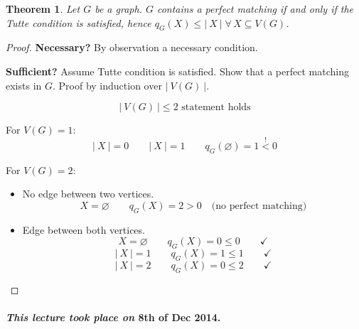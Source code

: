 \documentclass{article}
\newtheorem{theorem}{Theorem}
\newcommand{\card}[1]{\left|\:\!#1\:\!\right|}
\newcommand{\dateref}[1]{\paragraph{\textit{This lecture took place on} #1.}}
\newcommand{\fall}{\;\forall\,}
\begin{document}
\begin{theorem}\label{satz-6.6}
  Let $G$ be a graph. $G$ contains a perfect matching if and only if the Tutte condition is satisfied,
  hence $q_G(X) \leq \card{X} \fall X \subseteq V(G)$.
\end{theorem}

\begin{proof}
  \textbf{Necessary?} By observation a necessary condition.

  \textbf{Sufficient?} Assume Tutte condition is satisfied. Show that a perfect matching exists in $G$.
  Proof by induction over $\card{V(G)}$.

  \[ \card{V(G)} \leq 2 \text{ statement holds} \]

  For $V(G) = 1$:
  \[  \card{X} = 0 \qquad \card{X} = 1 \qquad q_G(\diameter) = 1 \stackrel{!}{<} 0 \]

  For $V(G) = 2$:
  \begin{itemize}
    \item No edge between two vertices.
      \[ X = \diameter \qquad q_G(X) = 2 > 0 \quad \text{(no perfect matching)} \]
    \item Edge between both vertices.
      \[ X = \diameter \qquad q_G(X) = 0 \leq 0 \qquad \checkmark \]
      \[ \card{X} = 1 \qquad q_G(X) = 1 \leq 1 \qquad \checkmark \]
      \[ \card{X} = 2 \qquad q_G(X) = 0 \leq 2 \qquad \checkmark \]
  \end{itemize}
\end{proof}

\dateref{8th of Dec 2014}
\end{document}
